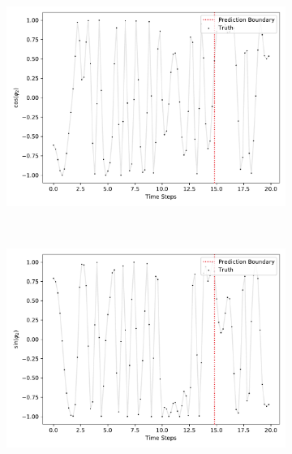 \begin{figure}
\begin{subfigure}{0.5\linewidth}
				\includegraphics[width=\linewidth]{figures/experiments/environments/observations-acrobot-gym-N0-D2.pdf}
			\end{subfigure}%
			~
			\begin{subfigure}{0.5\linewidth}
				\centering
				\includegraphics[width=\linewidth]{figures/experiments/environments/observations-acrobot-gym-N0-D3.pdf}
			\end{subfigure} \\
			\begin{subfigure}{0.5\linewidth}
				\centering

\end{subfigure}
\end{figure}
